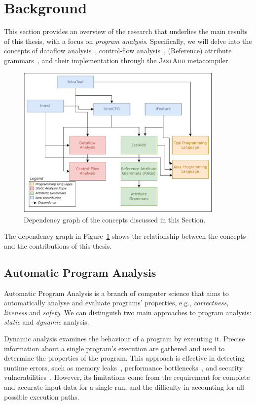 \section{Background}%
\label{sec:background}
This section provides an overview of the research that underlies the main results
of this thesis, with a focus on \emph{program analysis}. Specifically, we will delve into
the concepts of dataflow analysis~\cite{aho2007compilers,Nielson2010Principles},
control-flow analysis~\cite{allen1970control}, (Reference) attribute grammars~\cite{knuth1968semantics,hedin2000rags},
and their implementation through the \textsc{JastAdd} metacompiler.

\usetikzlibrary{backgrounds}
\begin{figure}[h]
    \centering
    \includegraphics[width=0.9\textwidth]{kappa/img/Dependencies.pdf}
  \caption{\label{fig:dependencygraph}Dependency graph of the concepts discussed in this Section.}
\end{figure}
The dependency graph in Figure~\ref{fig:dependencygraph} shows the relationship between
the concepts and the contributions of this thesis.

\subsection{Automatic Program Analysis}
Automatic Program Analysis is a branch of computer science that aims to automatically
analyse and evaluate programs' properties, e.g., \emph{correctness}, \emph{liveness} and \emph{safety}. We can distinguish two main
approaches to program analysis: \emph{static} and \emph{dynamic} analysis.

Dynamic analysis examines the behaviour of a program by executing it.
Precise information about a single program's execution are gathered
and used to determine the properties of the program.
This approach is effective in detecting runtime errors, such as memory leaks~\cite{Valgrind},
performance bottlenecks~\cite{Intel}, and security vulnerabilities~\cite{li2018fuzzing}.
However, its limitations come from the requirement for complete and
accurate input data for a single run, and the difficulty in accounting for
all possible execution paths.

